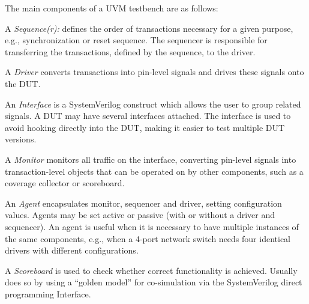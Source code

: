 \documentclass[conference]{IEEEtran}
\newcommand{\ducky}[1]{{\color{orange} Richard: #1}}
\newcommand{\kasper}[1]{{\color{purple} Kasper: #1}}
\renewcommand{\kasper}[1]{}
\renewcommand{\ducky}[1]{}
\begin{document}


The main components of a UVM testbench are as follows:

    A \textit{Sequence(r):} defines the order of transactions necessary for a given purpose, e.g., synchronization or reset sequence. The sequencer is responsible for transferring the transactions, defined by the sequence, to the driver.
    
    A \textit{Driver} converts transactions into pin-level signals and drives these signals onto the DUT.
    
    An \textit{Interface} is a SystemVerilog construct which allows the user to group related signals. A DUT may have several interfaces attached.
    The interface is used to avoid hooking directly into the DUT, making it easier to test multiple DUT versions.
    
    A \textit{Monitor} monitors all traffic on the interface, converting pin-level signals into transaction-level objects that can be operated on by other components, such as a coverage collector or scoreboard.
    
    An \textit{Agent} encapsulates monitor, sequencer and driver, setting configuration values. Agents may be set active or passive (with or without a driver and sequencer). An agent is useful when it is necessary to have multiple instances of the same components, e.g., when a 4-port network switch needs four identical drivers with different configurations.
    
    A \textit{Scoreboard} is used to check whether correct functionality is achieved. Usually does so by using a ``golden model'' for co-simulation via the SystemVerilog direct programming Interface.
    
\end{document}
